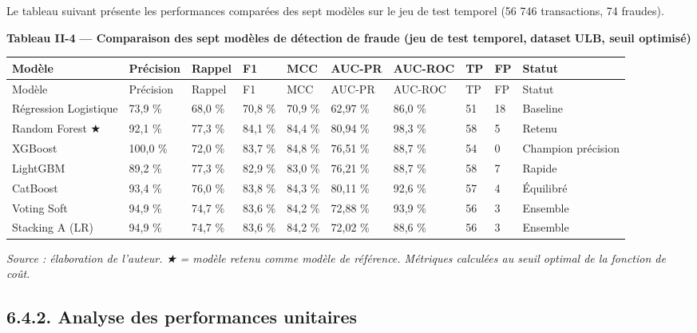 Le tableau suivant présente les performances comparées des sept modèles sur le jeu de test temporel (56 746 transactions, 74 fraudes).

\textbf{Tableau II-}\textbf{4}\textbf{ — Comparaison des sept modèles de détection de fraude (jeu de test temporel, }\textbf{dataset}\textbf{ ULB, seuil optimisé)}

\begin{landscape}
\scriptsize
\begin{longtable}{|p{}|p{}|p{}|p{}|p{}|p{}|p{}|p{}|p{}|p{}|}
\hline
Modèle & Précision & Rappel & F1 & MCC & AUC-PR & AUC-ROC & TP & FP & Statut \\
\hline
\endfirsthead
\hline
Modèle & Précision & Rappel & F1 & MCC & AUC-PR & AUC-ROC & TP & FP & Statut \\
\hline
\endhead
Régression Logistique & 73,9 \% & 68,0 \% & 70,8 \% & 70,9 \% & 62,97 \% & 86,0 \% & 51 & 18 & Baseline \\
\hline
Random Forest ★ & 92,1 \% & 77,3 \% & 84,1 \% & 84,4 \% & 80,94 \% & 98,3 \% & 58 & 5 & Retenu \\
\hline
XGBoost & 100,0 \% & 72,0 \% & 83,7 \% & 84,8 \% & 76,51 \% & 88,7 \% & 54 & 0 & Champion précision \\
\hline
LightGBM & 89,2 \% & 77,3 \% & 82,9 \% & 83,0 \% & 76,21 \% & 88,7 \% & 58 & 7 & Rapide \\
\hline
CatBoost & 93,4 \% & 76,0 \% & 83,8 \% & 84,3 \% & 80,11 \% & 92,6 \% & 57 & 4 & Équilibré \\
\hline
Voting Soft & 94,9 \% & 74,7 \% & 83,6 \% & 84,2 \% & 72,88 \% & 93,9 \% & 56 & 3 & Ensemble \\
\hline
Stacking A (LR) & 94,9 \% & 74,7 \% & 83,6 \% & 84,2 \% & 72,02 \% & 88,6 \% & 56 & 3 & Ensemble \\
\hline
\end{longtable}
\normalsize
\end{landscape}

\emph{Source : élaboration de l'auteur. }\emph{★}\emph{ = modèle retenu comme modèle de référence. Métriques calculées au seuil optimal de la fonction de coût.}

\subsection{6.4.2. Analyse des performances unitaires}

